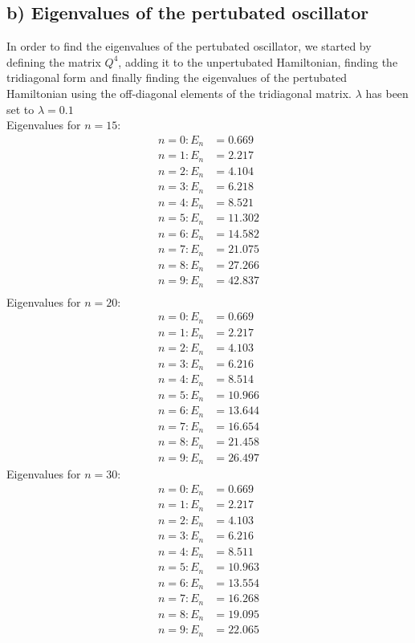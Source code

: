 \documentclass[12pt,a4paper]{article}
\begin{document}
\subsection*{b) Eigenvalues of the pertubated oscillator}
In order to find the eigenvalues of the pertubated oscillator, we started by defining the matrix $Q^4$, adding it to the unpertubated Hamiltonian, finding the tridiagonal form and finally finding the eigenvalues of the pertubated Hamiltonian using the off-diagonal elements of the tridiagonal matrix. $\lambda$ has been set to $\lambda=0.1$\\
Eigenvalues for $n=15$:
\begin{align*}
n = 0 : E_n &= 0.669\\
n = 1 : E_n &= 2.217\\
n = 2 : E_n &= 4.104\\
n = 3 : E_n &= 6.218\\
n = 4 : E_n &= 8.521\\
n = 5 : E_n &= 11.302\\
n = 6 : E_n &= 14.582\\
n = 7 : E_n &= 21.075\\
n = 8 : E_n &= 27.266\\
n = 9 : E_n &= 42.837\\
\end{align*}
Eigenvalues for $n=20$:
\begin{align*}
n = 0 : E_n &= 0.669\\
n = 1 : E_n &= 2.217\\
n = 2 : E_n &= 4.103\\
n = 3 : E_n &= 6.216\\
n = 4 : E_n &= 8.514\\
n = 5 : E_n &= 10.966\\
n = 6 : E_n &= 13.644\\
n = 7 : E_n &= 16.654\\
n = 8 : E_n &= 21.458\\
n = 9 : E_n &= 26.497
\end{align*}
Eigenvalues for $n=30$:
\begin{align*}
n = 0 : E_n &= 0.669\\
n = 1 : E_n &= 2.217\\
n = 2 : E_n &= 4.103\\
n = 3 : E_n &= 6.216\\
n = 4 : E_n &= 8.511\\
n = 5 : E_n &= 10.963\\
n = 6 : E_n &= 13.554\\
n = 7 : E_n &= 16.268\\
n = 8 : E_n &= 19.095\\
n = 9 : E_n &= 22.065\\
\end{align*}
\end{document}
